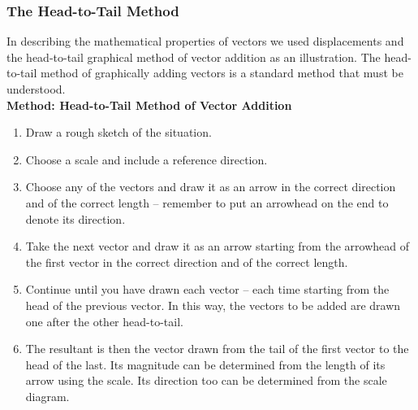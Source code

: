 \subsubsection*{The Head-to-Tail Method}
In describing the mathematical properties of vectors we used
displacements and the head-to-tail graphical method of vector addition
as an illustration. The head-to-tail method of graphically adding vectors is a standard method that must be understood.\\

\textbf{Method: Head-to-Tail Method of Vector Addition}
\begin{enumerate}[noitemsep, label=\textbf{\arabic*}.]
\item{Draw a rough sketch of the situation.}
\item{Choose a scale and include a reference direction.}
\item{Choose any of the vectors and draw it as an arrow in the
correct direction and of the correct length -- remember to put an
arrowhead on the end to denote its direction.}
\item{Take the next vector and draw it as an arrow starting from the
arrowhead of the first vector in the correct direction and of the
correct length.}
\item{Continue until you have drawn each vector -- each time starting
from the head of the previous vector. In this way, the vectors to be
added are drawn one after the other head-to-tail.}
\item{The resultant is then the vector drawn from the tail of the
first vector to the head of the last. Its magnitude can be
determined from the length of its arrow using the scale. Its
direction too can be determined from the scale diagram.}
\end{enumerate}

